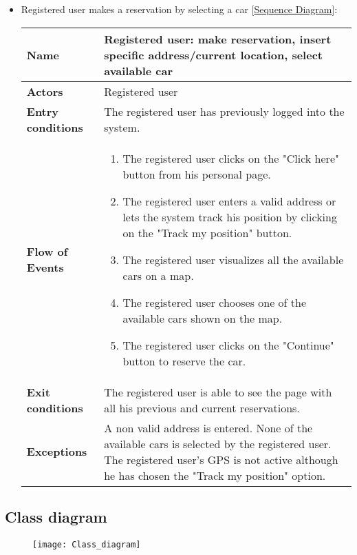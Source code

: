 \begin{itemize}
\begin{table}[H]
\begin{tabular}{| m{3.5cm} | m{9.5cm} |}
		\hline
	\end{tabular}
\end{table}
\newpage
\item Registered user makes a reservation by selecting a car [\hyperlink{Reservation}{Sequence Diagram}]:
\begin{table}[H]
	\centering
	\begin{tabular}{| m{3.5cm} | m{9.5cm} |}
		\hline
		\textbf{Name} & Registered user: make reservation, insert specific address/current location, select available car\\
		\hline
		\textbf{Actors} & Registered user\\
		\hline
		\textbf{Entry conditions} & The registered user has previously logged into the system.\\
		\hline
		\textbf{Flow of Events} & 
		\begin{enumerate}
			\item The registered user clicks on the "Click here" button from his personal page.
			\item The registered user enters a valid address or lets the system track his position by clicking on the "Track my position" button.
			\item The registered user visualizes all the available cars on a map.
			\item The registered user chooses one of the available cars shown on the map.
			\item The registered user clicks on the "Continue" button to reserve the car.   
		\end{enumerate} \\
		\hline
		\textbf{Exit conditions} & The registered user is able to see the page with all his previous and current reservations.\\
		\hline
		\textbf{Exceptions} & A non valid address is entered. None of the available cars is selected by the registered user. The registered user's GPS is not active although he has chosen the "Track my position" option.\\
		\hline
	\end{tabular}
\end{table}
\end{itemize}
\subsection{Class diagram}
\begin{figure}[H]
	\centering
	\texttt{[image: Class\_diagram]}
\end{figure}
